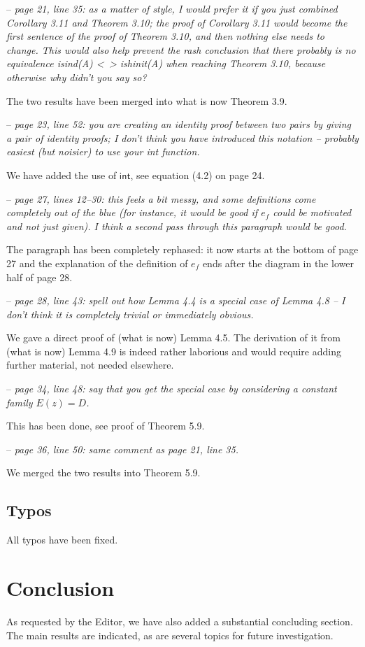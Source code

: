 \documentclass[10pt,a4paper,oneside,reqno]{amsart}
\numberwithin{equation}{section}
\theoremstyle{mythm}
\theoremstyle{mydef}
\theoremstyle{myrmk}
\begin{document}
-- \emph{page 21, line 35: as a matter of style, I would prefer it if you just combined Corollary 3.11 and Theorem 3.10; the proof of Corollary 3.11 would become the first sentence of the proof of Theorem 3.10, and then nothing else needs to change. This would also help prevent the rash conclusion that there probably is no
 equivalence isind(A) <~> ishinit(A) when reaching Theorem 3.10, because otherwise why didn't you say so?}  

The two results have been merged into what is now Theorem 3.9. 

-- \emph{page 23, line 52: you are creating an identity proof between two pairs by giving a pair of identity proofs; I don't think you have introduced this notation -- probably easiest (but noisier) to use your int function.} 

We have added the use of $\mathsf{int}$, see equation (4.2) on page 24. 

-- \emph{page 27, lines 12--30: this feels a bit messy, and some definitions come completely out of the blue (for instance, it would be good if $e_f$ could be motivated and not just given). I think a second pass through this paragraph would be good.} 

The paragraph has been completely rephased: it now starts at the bottom of page 27 and the explanation of the definition of $e_f$ ends after the diagram in the lower half of page 28.

-- \emph{page 28, line 43: spell out how Lemma 4.4 is a special case of Lemma 4.8 -- I don't think it is completely trivial or immediately obvious.} 

We gave a direct proof of (what is now) Lemma 4.5. The derivation of it from (what is now) Lemma 4.9 is indeed rather laborious and would require adding further material, not needed elsewhere. 

-- \emph{page 34, line 48: say that you get the special case by considering a constant family $E(z) = D$.} 

This has been done, see proof of Theorem 5.9. 

-- \emph{page 36, line 50: same comment as page 21, line 35.} 

We merged the two results into Theorem 5.9.




\subsection*{Typos} \hfill 

All typos have been fixed. 

\section{Conclusion}

As requested by the Editor, we have also added a substantial concluding section. The main results are indicated, as are several topics for future investigation.
\end{document}
